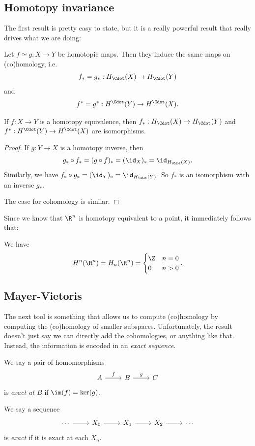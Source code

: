 \documentclass[a4paper]{article}
\theoremstyle{definition}
\begin{document}
\subsection{Homotopy invariance}
The first result is pretty easy to state, but it is a really powerful result that really drives what we are doing:

\begin{thm}
  Let $f \simeq g: X \to Y$ be homotopic maps. Then they induce the same maps on (co)homology, i.e.
  \[
    f_* = g_*: H_\Cdot(X) \to H_\Cdot(Y)
  \]
  and
  \[
    f^* = g^* : H^\Cdot(Y) \to H^\Cdot(X).
  \]
\end{thm}

\begin{cor}
  If $f: X \to Y$ is a homotopy equivalence, then $f_*: H_{\Cdot}(X) \to H_{\Cdot}(Y)$ and $f^*: H^{\Cdot}(Y) \to H^{\Cdot}(X)$ are isomorphisms.
\end{cor}

\begin{proof}
  If $g: Y \to X$ is a homotopy inverse, then
  \[
    g_* \circ f_* = (g \circ f)_* = (\id_X)_* = \id_{H_{\Cdot}(X)}.
  \]
  Similarly, we have $f_* \circ g_* = (\id_Y)_* = \id_{H_{\Cdot}(Y)}$. So $f_*$ is an isomorphism with an inverse $g_*$.

  The case for cohomology is similar.
\end{proof}

Since we know that $\R^n$ is homotopy equivalent to a point, it immediately follows that:
\begin{eg}
  We have
  \[
    H^n(\R^n) = H_n(\R^n) =
    \begin{cases}
      \Z & n = 0\\
      0 & n > 0
    \end{cases}.
  \]
\end{eg}

\subsection{Mayer-Vietoris}
The next tool is something that allows us to compute (co)homology by computing the (co)homology of smaller subspaces. Unfortunately, the result doesn't just say we can directly add the cohomologies, or anything like that. Instead, the information is encoded in an \emph{exact sequence}.

\begin{defi}
  We say a pair of homomorphisms
  \[
    \begin{tikzcd}
      A \ar[r, "f"] & B \ar[r, "g"] & C
    \end{tikzcd}
  \]
  is \emph{exact at $B$} if $\im(f) = \ker(g)$.

  We say a sequence
  \[
    \begin{tikzcd}
      \cdots \ar[r] & X_0 \ar[r] & X_1 \ar[r] & X_2 \ar[r] & \cdots
    \end{tikzcd}
  \]
  is \emph{exact} if it is exact at each $X_n$.
\end{defi}
\end{document}
